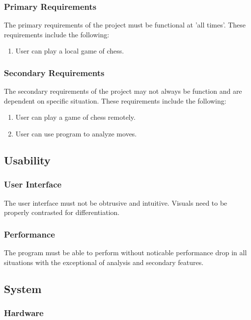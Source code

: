 \documentclass{article}
\begin{document}
\subsubsection{Primary Requirements}
The primary requirements of the project must be functional at 'all times'. These requirements include the following:
\begin{enumerate}
\item User can play a local game of chess.
\end{enumerate}


\subsubsection{Secondary Requirements}
The secondary requirements of the project may not always be function and are dependent on specific situation. These requirements include the following:
\begin{enumerate}
\item User can play a game of chess remotely.
\item User can use program to analyze moves.
\end{enumerate}
\subsection{Usability}
\subsubsection{User Interface}
The user interface must not be obtrusive and intuitive. Visuals need to be properly contrasted for differentiation. 
\subsubsection{Performance}
The program must be able to perform without noticable performance drop in all situations with the exceptional of analysis and secondary features.
\subsection{System}
\subsubsection{Hardware}
\end{document}
